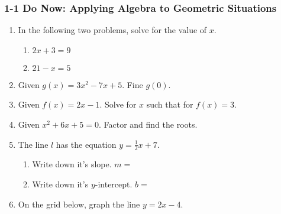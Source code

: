 \documentclass[12pt, twoside]{article}
\begin{document}
\subsubsection*{1-1 Do Now: Applying Algebra to Geometric Situations}
  \begin{enumerate}


  \item In the following two problems, solve for the value of $x$.
  \begin{multicols}{2}
    \begin{enumerate}
      \item   $2x+3=9$ \vspace{6cm}
      \item   $21-x=5$ \vspace{6cm}
    \end{enumerate}
  \end{multicols}
    \vspace{3cm}

  \item Given $g(x)=3x^2-7x+5$. Fine $g(0)$. \vspace{4cm}
  \item Given $f(x)=2x-1$. Solve for $x$ such that for $f(x)=3$. \vspace{5cm}
  \item Given $x^2+6x+5=0$. Factor and find the roots. \vspace{4cm}
  
\newpage

\item The line $l$ has the equation $y=\frac{1}{2}x+7$. \vspace{0.5cm}
\begin{enumerate}
  \item Write down it's slope. $m=$
  \vspace{1cm}
  \item Write down it's $y$-intercept. $b=$
\end{enumerate}
\vspace{1cm}

\item On the grid below, graph the line $y=2x-4$.
  \vspace{0.5cm}

    \begin{center} %
    \end{center}

\end{enumerate}
\end{document}
